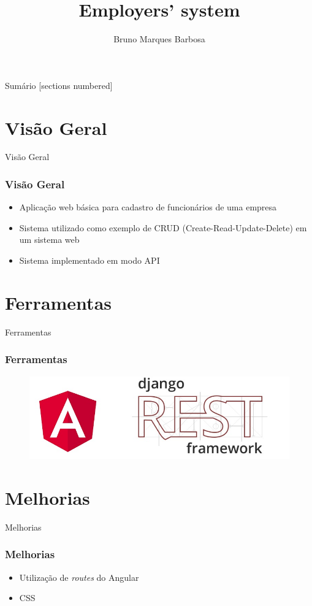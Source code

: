 \documentclass[12pt]{beamer}
\title{Employers' system}
\author{Bruno Marques Barbosa}
\begin{document}
\maketitle


\begin{frame}{Sumário}
  [sections numbered]
  \tableofcontents[currentsection]
\end{frame}

\section{Visão Geral}
\begin{frame}{Visão Geral}
\frametitle{Visão Geral}

\begin{itemize}
\item Aplicação web básica para cadastro de funcionários de uma empresa 
\pause
\item Sistema utilizado como exemplo de CRUD (Create-Read-Update-Delete) em um sistema web
\pause
\item Sistema implementado em modo API
\end{itemize}

\end{frame}

\section{Ferramentas}
\begin{frame}{Ferramentas}
\frametitle{Ferramentas}

\begin{figure}
\includegraphics[scale=.3]{img/angular-rest}
\end{figure}

\end{frame}

\section{Melhorias}
\begin{frame}{Melhorias}
\frametitle{Melhorias}
\begin{itemize}
\item Utilização de \textit{routes} do Angular
\pause
\item CSS
\end{itemize}

\end{frame}
\end{document}
